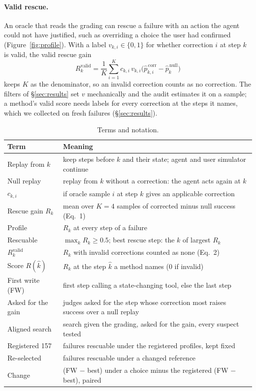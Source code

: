 \documentclass[11pt]{article}
\newcommand{\Rhat}{R(\hat{k})}
\begin{document}
\paragraph{Valid rescue.} An oracle that reads the grading can rescue a failure with an action the agent could not have justified, such as overriding a choice the user had confirmed (Figure~\ref{fig:profile}). With a label $v_{k,i}\in\{0,1\}$ for whether correction $i$ at step $k$ is valid, the valid rescue gain
\begin{equation}
R^{\mathrm{valid}}_k=\frac{1}{K}\sum_{i=1}^{K}c_{k,i}\,v_{k,i}\bigl(\hat{p}^{\,\mathrm{corr}}_{k,i}-\hat{p}^{\,\mathrm{null}}_{k}\bigr)
\end{equation}
keeps $K$ as the denominator, so an invalid correction counts as no correction. The filters of \S\ref{sec:results} set $v$ mechanically and the audit estimates it on a sample; a method's valid score needs labels for every correction at the steps it names, which we collected on fresh failures (\S\ref{sec:results}).

\begin{table}[t]
\centering
\footnotesize
\setlength{\tabcolsep}{3pt}
\begin{tabular}{@{}>{\raggedright\arraybackslash}p{}>{\raggedright\arraybackslash}p{}@{}}
\toprule
Term & Meaning \\
\midrule
Replay from $k$ & keep steps before $k$ and their state; agent and user simulator continue \\
Null replay & replay from $k$ without a correction: the agent acts again at $k$ \\
$c_{k,i}$ & 1 if oracle sample $i$ at step $k$ gives an applicable correction \\
Rescue gain $R_k$ & mean over $K=4$ samples of corrected minus null success (Eq.~1) \\
Profile & $R_k$ at every step of a failure \\
Rescuable & $\max_k R_k\ge0.5$; best rescue step: the $k$ of largest $R_k$ \\
$R^{\mathrm{valid}}_k$ & $R_k$ with invalid corrections counted as none (Eq.~2) \\
Score $\Rhat$ & $R_k$ at the step $\hat{k}$ a method names (0 if invalid) \\
First write (FW) & first step calling a state-changing tool, else the last step \\
Asked for the gain & judges asked for the step whose correction most raises success over a null replay \\
Aligned search & search given the grading, asked for the gain, every suspect tested \\
Registered 157 & failures rescuable under the registered profiles, kept fixed \\
Re-selected & failures rescuable under a changed reference \\
Change & (FW $-$ best) under a choice minus the registered (FW $-$ best), paired \\
\bottomrule
\end{tabular}
\caption{Terms and notation.}
\label{tab:terms}
\end{table}
\end{document}
